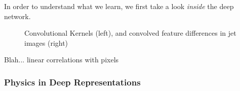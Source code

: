 \documentclass{article}
\begin{document}
In order to understand what we learn, we first take a look \emph{inside} the deep network. 
\begin{figure}[bt]
  \begin{center}
      \caption{Convolutional Kernels (left), and convolved feature differences in jet images (right)}
      \label{fig:convkernels}

    \end{center}
\end{figure}



Blah... linear correlations with pixels





\subsubsection{Physics in Deep Representations} %
\label{ssub:physics_in_deep_representations}
\end{document}
